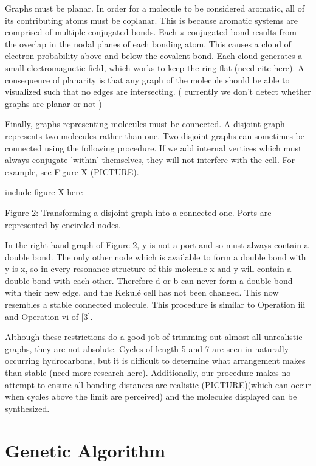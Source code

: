 \documentclass[12pt]{article}
\begin{document}
Graphs must be planar. In order for a molecule to be considered aromatic, all of its contributing atoms must be coplanar. This is because aromatic systems are comprised of multiple conjugated bonds. Each $\pi$ conjugated bond results from the overlap in the nodal planes of each bonding atom. This causes a cloud of electron probability above and below the covalent bond. Each cloud generates a small electromagnetic field, which works to keep the ring flat (need cite here). A consequence of planarity is that any graph of the molecule should be able to visualized such that no edges are intersecting. (  currently we don't detect whether graphs are planar or not ) 

Finally, graphs representing molecules must be connected. A disjoint graph represents two molecules rather than one. Two disjoint graphs can sometimes be connected using the following procedure. If we add internal vertices which must always conjugate ’within’ themselves, they will not interfere with the cell. For example, see Figure X (PICTURE).

include figure X here

Figure 2: Transforming a disjoint graph into a connected one. Ports are represented by encircled nodes.

In the right-hand graph of Figure 2, y is not a port and so must always contain a double bond. The only other node which is available to form a double bond with y is x, so in every resonance structure of this molecule x and y will contain a double bond with each other. Therefore d or b can never form a double bond with their new edge, and the Kekul\'e cell has not been changed. This now resembles a stable connected molecule.
This procedure is similar to Operation iii and Operation vi of [3].

Although these restrictions do a good job of trimming out almost all unrealistic graphs, they are not absolute. Cycles of length 5 and 7 are seen in naturally occurring hydrocarbons, but it is difficult to determine what arrangement makes than stable (need more research here). Additionally, our procedure makes no attempt to ensure all bonding distances are realistic (PICTURE)(which can occur when cycles above the limit are perceived) and the molecules displayed can be synthesized. 

\section{Genetic Algorithm}
\end{document}
